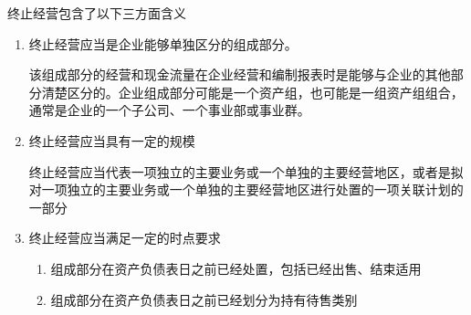 \documentclass[UTF8,12pt]{ctexart}
\numberwithin{equation}{section} %
\numberwithin{figure}{section}
\numberwithin{table}{section}
\begin{document}
	终止经营包含了以下三方面含义
	\begin{enumerate}
		\item 终止经营应当是企业能够单独区分的组成部分。
		
		该组成部分的经营和现金流量在企业经营和编制报表时是能够与企业的其他部分清楚区分的。企业组成部分可能是一个资产组，也可能是一组资产组组合，通常是企业的一个子公司、一个事业部或事业群。
		
		\item 终止经营应当具有一定的规模
		
		终止经营应当代表一项独立的主要业务或一个单独的主要经营地区，或者是拟对一项独立的主要业务或一个单独的主要经营地区进行处置的一项关联计划的一部分
		
		\item 终止经营应当满足一定的时点要求
		\begin{enumerate}
			\item 组成部分在资产负债表日之前已经处置，包括已经出售、结束适用
			
			\item 组成部分在资产负债表日之前已经划分为持有待售类别
		\end{enumerate}
	\end{enumerate}
\end{document}
